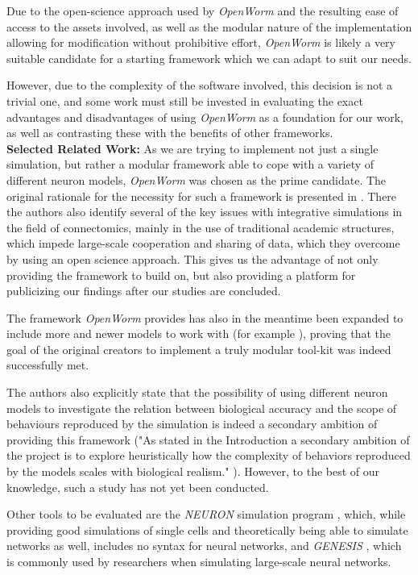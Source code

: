 \documentclass[a4paper,11pt]{article}
\begin{document}
Due to the open-science approach used by \emph{OpenWorm} and the resulting ease of access to the assets involved, as well as the modular nature of the implementation allowing for modification without prohibitive effort, \emph{OpenWorm} is likely a very suitable candidate for a starting framework which we can adapt to suit our needs.

However, due to the complexity of the software involved, this decision is not a trivial one, and some work must still be invested in evaluating the exact advantages and disadvantages of using \emph{OpenWorm} as a foundation for our work, as well as contrasting these with the benefits of other frameworks.
\\[0,2cm]

\textbf{Selected Related Work:}
As we are trying to implement not just a single simulation, but rather a modular framework able to cope with a variety of different neuron models, \emph{OpenWorm} was chosen as the prime candidate. The original rationale for the necessity for such a framework is presented in \citep{Szigeti2014}. There the authors also identify several of the key issues with integrative simulations in the field of connectomics, mainly in the use of traditional academic structures, which impede large-scale cooperation and sharing of data, which they overcome by using an open science approach. This gives us the advantage of not only providing the framework to build on, but also providing a platform for publicizing our findings after our studies are concluded.

The framework \emph{OpenWorm} provides has also in the meantime been expanded to include more and newer models to work with (for example \citep{M.2013}), proving that the goal of the original creators to implement a truly modular tool-kit was indeed successfully met.

The authors also explicitly state that the possibility of using different neuron models to investigate the relation between biological accuracy and the scope of behaviours reproduced by the simulation is indeed a secondary ambition of providing this framework ("As stated in the Introduction a secondary ambition of the project is to explore heuristically how the complexity of behaviors reproduced by the models scales with biological realism."  \citet{Szigeti2014}). However, to the best of our knowledge, such a study has not yet been conducted.

Other tools to be evaluated are the \emph{NEURON} simulation program \citep{Hines1994}, which, while providing good simulations of single cells and theoretically being able to simulate networks as well, includes no syntax for neural networks, and \emph{GENESIS} \citep{Bower2003}, which is commonly used by researchers when simulating large-scale neural networks. 
\end{document}
